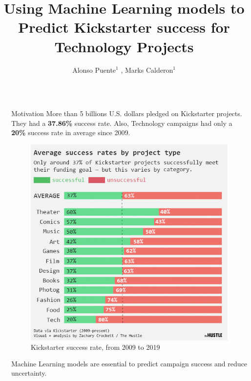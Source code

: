 \documentclass[final]{beamer}
\title{Using Machine Learning models to Predict Kickstarter success for Technology Projects} %
\author{Alonso Puente$^{1}$ , Marks Calderon$^{1}$} %
\institute{$^{1}$ESAN University} %
\newlength{\sepwid}
\newlength{\onecolwid}
\begin{document}

\setlength{\belowcaptionskip}{2ex} %
\setlength\belowdisplayshortskip{2ex} %

\begin{frame}[t] %

\begin{columns}[t] %

\begin{column}{\sepwid}\end{column} %

\begin{column}{\onecolwid} %



\begin{block}{Motivation}
More than 5 billions U.S. dollars pledged on Kickstarter projects. They had a \textbf{37.86\%} success rate. Also, Technology campaigns had only a \textbf{20\%} success rate in average since 2009. 
	\begin{figure}
		\includegraphics[width=0.5\linewidth]{kickstarter_success_rate_2009_2019.jpg}
		\caption{Kickstarter success rate, from 2009 to 2019}
	\end{figure}

Machine Learning models are essential to predict campaign success and reduce uncertainty.


\end{block}
\end{column}
\end{columns}
\end{frame}
\end{document}
